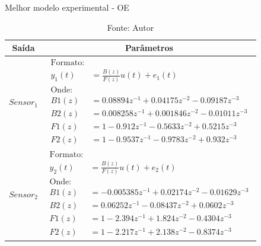 \begin{table}[h]
	\centering
	\caption{Melhor modelo experimental - OE}
	\label{tab:tclabsp-model-oe}
	\begin{tabular}{c|c} \toprule
		{Saída}			&	{Parâmetros}									\\ \midrule
		$Sensor_1$			&
								$ 
									\begin{aligned}
										\text{Formato:}														\\
										y_1(t) &= \frac{B(z)}{F(z)}u(t) + e_1(t)							\\
										\text{Onde:}														\\
										B1(z) &= 0.08894 z^{-1} + 0.04175 z^{-2} - 0.09187 z^{-3}   		\\
										B2(z) &= 0.008258 z^{-1} + 0.001846 z^{-2} - 0.01011 z^{-3} 		\\
										F1(z) &= 1 - 0.912 z^{-1} - 0.5633 z^{-2} + 0.5215 z^{-3}  			\\
										F2(z) &= 1 - 0.9537 z^{-1} - 0.9783 z^{-2} + 0.932 z^{-3}    
									\end{aligned}
								$	
							\\ \midrule
		$Sensor_2$			&
								$ 
									\begin{aligned}
										\text{Formato:}														\\
										y_2(t) &= \frac{B(z)}{F(z)}u(t) + e_2(t)							\\
										\text{Onde:}														\\
										B1(z) &= -0.005385 z^{-1} + 0.02174 z^{-2} - 0.01629 z^{-3}    		\\
										B2(z) &= 0.06252 z^{-1} - 0.08437 z^{-2} + 0.0602 z^{-3}			\\
										F1(z) &= 1 - 2.394 z^{-1} + 1.824 z^{-2} - 0.4304 z^{-3} 			\\
										F2(z) &= 1 - 2.217 z^{-1} + 2.138 z^{-2} - 0.8374 z^{-3}  	
									\end{aligned}
								$
							\\ \bottomrule
	\end{tabular}
	\caption*{Fonte: Autor}
\end{table}

